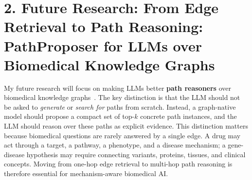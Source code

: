 \documentclass[10pt,letterpaper]{article}
\begin{document}
\section*{2. Future Research: From Edge Retrieval to Path Reasoning: PathProposer for LLMs over Biomedical Knowledge Graphs}
My future research will focus on making LLMs better \textbf{path reasoners} over biomedical knowledge graphs~\cite{llmkgsurvey,kgagentmed}. The key distinction is that the LLM should not be asked to \textit{generate} or \textit{search for} paths from scratch. Instead, a graph-native model should propose a compact set of top-$k$ concrete path instances, and the LLM should reason over these paths as explicit evidence. This distinction matters because biomedical questions are rarely answered by a single edge. A drug may act through a target, a pathway, a phenotype, and a disease mechanism; a gene-disease hypothesis may require connecting variants, proteins, tissues, and clinical concepts. Moving from one-hop edge retrieval to multi-hop path reasoning is therefore essential for mechanism-aware biomedical AI.
\end{document}

